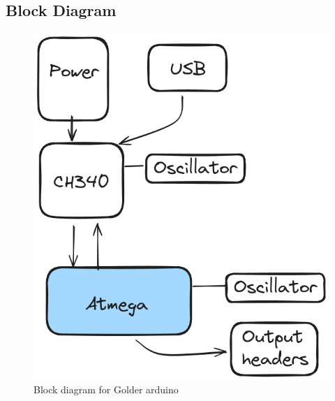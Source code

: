 \documentclass[a4paper,11pt]{article}%
\begin{document}
\subsection{Block Diagram}

\begin{figure}[H]
	\centering
	\includegraphics[scale=0.4]{figures/blockdiagram.png}
	\caption{Block diagram for Golder arduino}
\end{figure}
\end{document}
